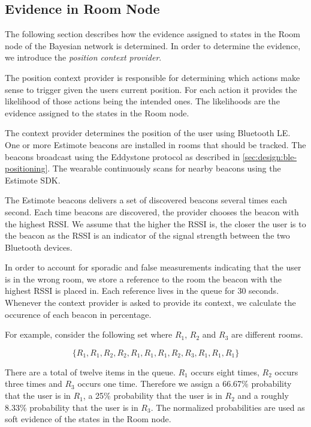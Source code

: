 \subsection{Evidence in Room Node}
\label{sec:design:bayesian-network:room-node-evidence}

The following section describes how the evidence assigned to states in the Room node of the Bayesian network is determined. In order to determine the evidence, we introduce the \emph{position context provider}.

The position context provider is responsible for determining which actions make sense to trigger given the users current position. For each action it provides the likelihood of those actions being the intended ones. The likelihoods are the evidence assigned to the states in the Room node.

The context provider determines the position of the user using Bluetooth LE. One or more Estimote beacons are installed in rooms that should be tracked. The beacons broadcast using the Eddystone protocol as described in \cref{sec:design:ble-positioning}. The wearable continuously scans for nearby beacons using the Estimote SDK.

The Estimote beacons delivers a set of discovered beacons several times each second. Each time beacons are discovered, the provider chooses the beacon with the highest RSSI. We assume that the higher the RSSI is, the closer the user is to the beacon as the RSSI is an indicator of the signal strength between the two Bluetooth devices.

In order to account for sporadic and false measurements indicating that the user is in the wrong room, we store a reference to the room the beacon with the highest RSSI is placed in. Each reference lives in the queue for 30 seconds.  Whenever the context provider is asked to provide its context, we calculate the occurence of each beacon in percentage.

For example, consider the following set where $R_1$, $R_2$ and $R_3$ are different rooms.

\begin{equation*}
  \{ R_1, R_1, R_2, R_2, R_1, R_1, R_1, R_2, R_3, R_1, R_1, R_1 \}
\end{equation*}

There are a total of twelve items in the queue. $R_1$ occurs eight times, $R_2$ occurs three times and $R_3$ occurs one time. Therefore we assign a 66.67\% probability that the user is in $R_1$, a 25\% probability that the user is in $R_2$ and a roughly 8.33\% probability that the user is in $R_3$. The normalized probabilities are used as soft evidence of the states in the Room node.

